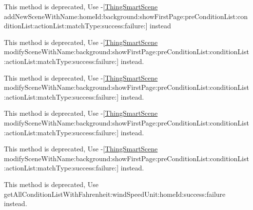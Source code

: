 \begin{DoxyRefList}
\label{deprecated__deprecated000083}%
%
This method is deprecated, Use -\/\mbox{[}\mbox{\hyperlink{interface_thing_smart_scene}{Thing\+Smart\+Scene}} add\+New\+Scene\+With\+Name\+:home\+Id\+:background\+:show\+First\+Page\+:pre\+Condition\+List\+:condition\+List\+:action\+List\+:match\+Type\+:success\+:failure\+:\mbox{]} instead  
\item[Member \mbox{\hyperlink{interface_thing_smart_scene_a823c4bc9f13c51dee826421533e48184}{\mbox{[}Thing\+Smart\+Scene modify\+Scene\+With\+Name\+:background\+:show\+First\+Page\+:condition\+List\+:action\+List\+:match\+Type\+:success\+:failure\+:\mbox{]}}} ]\label{deprecated__deprecated000084}%
%
This method is deprecated, Use -\/\mbox{[}\mbox{\hyperlink{interface_thing_smart_scene}{Thing\+Smart\+Scene}} modify\+Scene\+With\+Name\+:background\+:show\+First\+Page\+:pre\+Condition\+List\+:condition\+List\+:action\+List\+:match\+Type\+:success\+:failure\+:\mbox{]} instead. 

\label{deprecated__deprecated000076}%
%
This method is deprecated, Use -\/\mbox{[}\mbox{\hyperlink{interface_thing_smart_scene}{Thing\+Smart\+Scene}} modify\+Scene\+With\+Name\+:background\+:show\+First\+Page\+:pre\+Condition\+List\+:condition\+List\+:action\+List\+:match\+Type\+:success\+:failure\+:\mbox{]} instead. 

\label{deprecated__deprecated000080}%
%
This method is deprecated, Use -\/\mbox{[}\mbox{\hyperlink{interface_thing_smart_scene}{Thing\+Smart\+Scene}} modify\+Scene\+With\+Name\+:background\+:show\+First\+Page\+:pre\+Condition\+List\+:condition\+List\+:action\+List\+:match\+Type\+:success\+:failure\+:\mbox{]} instead. 

\label{deprecated__deprecated000088}%
%
This method is deprecated, Use -\/\mbox{[}\mbox{\hyperlink{interface_thing_smart_scene}{Thing\+Smart\+Scene}} modify\+Scene\+With\+Name\+:background\+:show\+First\+Page\+:pre\+Condition\+List\+:condition\+List\+:action\+List\+:match\+Type\+:success\+:failure\+:\mbox{]} instead.  
\item[Member \mbox{\hyperlink{interface_thing_smart_scene_manager_aa5e588835fee7e21261d19b19eda2d6a}{\mbox{[}Thing\+Smart\+Scene\+Manager get\+All\+Condition\+List\+With\+Fahrenheit\+:home\+Id\+:success\+:failure\+:\mbox{]}}} ]\label{deprecated__deprecated000086}%
%
This method is deprecated, Use get\+All\+Condition\+List\+With\+Fahrenheit\+:wind\+Speed\+Unit\+:home\+Id\+:success\+:failure instead. 


\end{DoxyRefList}
